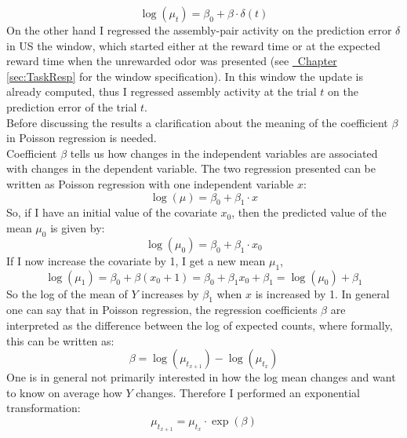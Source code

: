 \begin{equation}
    \log(\mu_t)=\beta_0+\beta\cdot\delta(t)
    \label{eq:regrDelta}
\end{equation}
On the other hand I regressed the assembly-pair activity on the prediction error $\delta$ in US the window, which started either at the reward time or at the expected reward time when the unrewarded odor was presented (see \hyperref[sec:TaskResp]{~Chapter \ref*{sec:TaskResp}} for the window specification). In this window the update is already computed, thus I regressed assembly activity at the trial $t$ on the prediction error of the trial $t$.\\
Before discussing the results a clarification about the meaning of the coefficient $\beta$ in Poisson regression is needed.\\
Coefficient $\beta$ tells us how changes in the independent variables are associated with changes in the dependent variable.
The two regression presented can be written as Poisson regression with one independent variable $x$:
\begin{equation}
    \log(\mu)=\beta_0+\beta_1\cdot x
    \label{eq:betaCoeff}
\end{equation}
So, if I have an initial value of the covariate $x_0$, then the predicted value of the mean $\mu_0$ is given by:
\begin{equation*}
    \log(\mu_0)=\beta_0+\beta_1\cdot x_0
    \label{eq:betaCoeff0}
\end{equation*}
If I now increase the covariate by 1, I get a new mean $\mu_1$,
\begin{equation*}
    \log(\mu_1)=\beta_0+\beta(x_0+1)=\beta_0+\beta_1x_0+\beta_1=\log(\mu_0)+\beta_1
    \label{eq:betaCoeff1}
\end{equation*}
So the log of the mean of $Y$ increases by $\beta_1$ when $x$ is increased by 1.
In general one can say that in Poisson regression, the regression coefficients $\beta$ are interpreted as the difference between the log of expected counts, where formally, this can be written as:
\begin{equation}
    \beta=\log(\mu_{t_{x+1}})-\log(\mu_{t_{x}})
    \label{eq:BetaRelLog}
\end{equation}
One is in general not primarily interested in how the log mean changes and want to know on average how $Y$ changes. Therefore I performed an exponential transformation:
\begin{equation}
    \mu_{t_{x+1}}=\mu_{t_x}\cdot \exp(\beta)
    \label{eq:BetaRelExp}
\end{equation}

